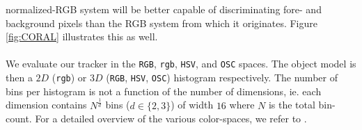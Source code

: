 \documentclass[a4paper,11pt]{article}
\begin{document}
			normalized-RGB system will be better capable of discriminating fore-
			and background pixels than the RGB system from which it originates.
			Figure \ref{fig:CORAL} illustrates this as well.
			\\ \\
			We evaluate our tracker in the \verb|RGB|, \verb|rgb|, \verb|HSV|, and
			\verb|OSC| spaces. The object model is then a $2D$ (\verb|rgb|) or $3D$
			(\verb|RGB|, \verb|HSV|, \verb|OSC|) histogram respectively. The number
			of bins per histogram is not a function of the number of dimensions, ie.
			each dimension contains $N^{\frac{1}{d}}$ bins ($d \in \{2, 3\}$) of width
			$16$ where $N$ is the total bin-count. For a detailed overview of the various
			color-spaces, we refer to \cite{COLOR}.

\end{document}
